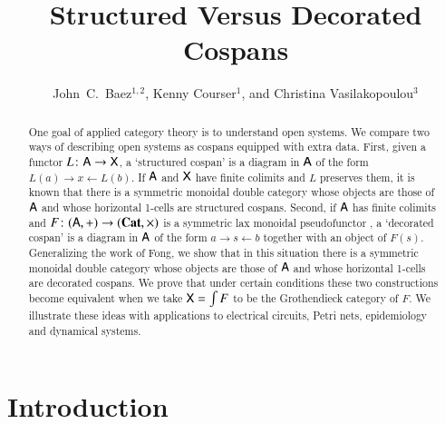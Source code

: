 \documentclass[reqno]{amsart}
\title{Structured Versus Decorated Cospans}
\author{John\ C.\ Baez$^{1,2}$, Kenny Courser$^1$, and Christina Vasilakopoulou$^3$}
\begin{document}
\begin{abstract}
One goal of applied category theory is to understand open systems.  We compare two ways of describing open systems as cospans equipped with extra data.    First, given a functor $L \colon \mathsf{A} \to \mathsf{X}$, a `structured cospan' is a diagram in $\mathsf{A}$ of the form $L(a) \rightarrow x \leftarrow L(b)$.  If $\mathsf{A}$ and $\mathsf{X}$ have finite colimits and $L$ preserves them, it is known that there is a symmetric monoidal double category whose objects are those of $\mathsf{A}$ and whose horizontal 1-cells are structured cospans.   Second, if $\mathsf{A}$ has finite colimits and $F \colon (\mathsf{A},+) \to (\mathbf{Cat},\times)$ is a symmetric lax monoidal pseudofunctor , a `decorated cospan' is a diagram in $\mathsf{A}$ of the form $a \rightarrow s \leftarrow b$ together with an object of $F(s)$.   Generalizing the work of Fong, we show that in this situation there is a symmetric monoidal double category whose objects are those of $\mathsf{A}$ and whose horizontal 1-cells are decorated cospans.   We prove that under certain conditions these two constructions become equivalent when we take $\mathsf{X} = \int F$ to be the Grothendieck category of $F$.  We illustrate these ideas with applications to electrical circuits, Petri nets, epidemiology and dynamical systems.
\end{abstract}

\maketitle

\setcounter{tocdepth}{1}
\tableofcontents

\section{Introduction}
\end{document}
